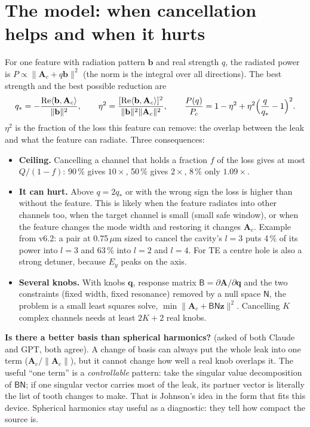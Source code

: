 \documentclass[11pt,a4paper]{article}
\begin{document}
\section{The model: when cancellation helps and when it hurts}
For one feature with radiation pattern $\mathbf b$ and real strength $q$, the radiated power is
$P\propto\|\mathbf A_c+q\mathbf b\|^2$ (the norm is the integral over all directions). The best strength and the best
possible reduction are
\begin{equation}
q_*=-\frac{\mathrm{Re}\langle\mathbf b,\mathbf A_c\rangle}{\|\mathbf b\|^2},\qquad
\eta^2=\frac{[\mathrm{Re}\langle\mathbf b,\mathbf A_c\rangle]^2}{\|\mathbf b\|^2\|\mathbf A_c\|^2},\qquad
\frac{P(q)}{P_c}=1-\eta^2+\eta^2\Bigl(\frac{q}{q_*}-1\Bigr)^2 .
\end{equation}
$\eta^2$ is the fraction of the loss this feature can remove: the overlap between the leak and what the feature can
radiate. Three consequences:
\begin{itemize}\setlength{\itemsep}{1pt}
\item \textbf{Ceiling.} Cancelling a channel that holds a fraction $f$ of the loss gives at most $Q/(1-f)$: 90\,\% gives
$10\times$, 50\,\% gives $2\times$, 8\,\% only $1.09\times$.
\item \textbf{It can hurt.} Above $q=2q_*$ or with the wrong sign the loss is higher than without the feature. This is
likely when the feature radiates into other channels too, when the target channel is small (small safe window), or when
the feature changes the mode width and restoring it changes $\mathbf A_c$. Example from v6.2: a pair at 0.75\,$\mu$m sized
to cancel the cavity's $l=3$ puts 4\,\% of its power into $l=3$ and 63\,\% into $l=2$ and $l=4$. For TE a centre hole is
also a strong detuner, because $E_y$ peaks on the axis.
\item \textbf{Several knobs.} With knobs $\mathbf q$, response matrix $\mathsf B=\partial\mathbf A/\partial\mathbf q$ and the
two constraints (fixed width, fixed resonance) removed by a null space $\mathsf N$, the problem is a small least squares
solve, $\min\|\mathbf A_c+\mathsf{BN}\mathbf z\|^2$. Cancelling $K$ complex channels needs at least $2K+2$ real knobs.
\end{itemize}

\textbf{Is there a better basis than spherical harmonics?} (asked of both Claude and GPT, both agree). A change of basis
can always put the whole leak into one term ($\mathbf A_c/\|\mathbf A_c\|$), but it cannot change how well a real knob
overlaps it. The useful ``one term'' is a \emph{controllable} pattern: take the singular value decomposition of
$\mathsf{BN}$; if one singular vector carries most of the leak, its partner vector is literally the list of tooth
changes to make. That is Johnson's idea in the form that fits this device. Spherical harmonics stay useful as a
diagnostic: they tell how compact the source is.
\end{document}

